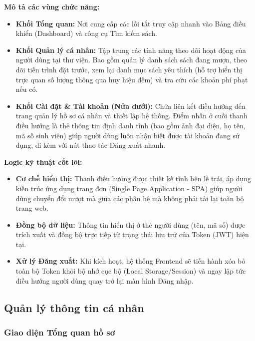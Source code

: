 \noindent\textbf{Mô tả các vùng chức năng:}
\begin{itemize}
    \item \textbf{Khối Tổng quan:} Nơi cung cấp các lối tắt truy cập nhanh vào Bảng điều khiển (Dashboard) và công cụ Tìm kiếm sách.
    \item \textbf{Khối Quản lý cá nhân:} Tập trung các tính năng theo dõi hoạt động của người dùng tại thư viện. Bao gồm quản lý danh sách sách đang mượn, theo dõi tiến trình đặt trước, xem lại danh mục sách yêu thích (hỗ trợ hiển thị trực quan số lượng thông qua huy hiệu đếm) và tra cứu các khoản phí phạt nếu có.
    \item \textbf{Khối Cài đặt \& Tài khoản (Nửa dưới):} Chứa liên kết điều hướng đến trang quản lý hồ sơ cá nhân và thiết lập hệ thống. Điểm nhấn ở cuối thanh điều hướng là thẻ thông tin định danh tĩnh (bao gồm ảnh đại diện, họ tên, mã số sinh viên) giúp người dùng luôn nhận biết được tài khoản đang sử dụng, đi kèm với nút thao tác Đăng xuất nhanh.
\end{itemize}

\vspace{0.5cm}
\noindent\textbf{Logic kỹ thuật cốt lõi:}
\begin{itemize}
    \item \textbf{Cơ chế hiển thị:} Thanh điều hướng được thiết kế tĩnh bên lề trái, áp dụng kiến trúc ứng dụng trang đơn (Single Page Application - SPA) giúp người dùng chuyển đổi mượt mà giữa các phân hệ mà không phải tải lại toàn bộ trang web.
    \item \textbf{Đồng bộ dữ liệu:} Thông tin hiển thị ở thẻ người dùng (tên, mã số) được trích xuất và đồng bộ trực tiếp từ trạng thái lưu trữ của Token (JWT) hiện tại.
    \item \textbf{Xử lý Đăng xuất:} Khi kích hoạt, hệ thống Frontend sẽ tiến hành xóa bỏ toàn bộ Token khỏi bộ nhớ cục bộ (Local Storage/Session) và ngay lập tức điều hướng người dùng quay trở lại màn hình Đăng nhập.
\end{itemize}

\subsection{Quản lý thông tin cá nhân}

\subsubsection{Giao diện Tổng quan hồ sơ}

